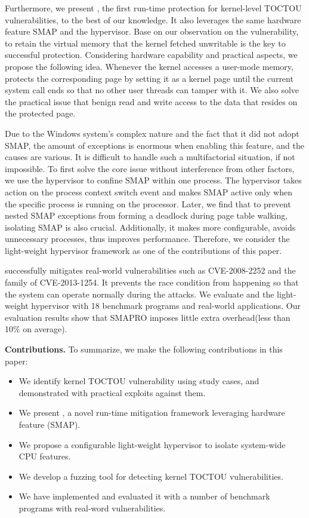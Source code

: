 Furthermore, we present \name, the first run-time protection for kernel-level TOCTOU vulnerabilities, to the best of our knowledge. It also leverages the same hardware feature SMAP and the hypervisor. Base on our observation on the vulnerability, to retain the virtual memory that the kernel fetched unwritable is the key to successful protection. Considering hardware capability and practical aspects, we propose the following idea. Whenever the kernel accesses a user-mode memory, \name protects the corresponding page by setting it as a kernel page until the current system call ends so that no other user threads can tamper with it. We also solve the practical issue that benign read and write access to the data that resides on the protected page.


Due to the Windows system's complex nature and the fact that it did not adopt SMAP, the amount of exceptions is enormous when enabling this feature, and the causes are various. It is difficult to handle such a multifactorial situation, if not impossible. To first solve the core issue without interference from other factors, we use the hypervisor to confine SMAP within one process. The hypervisor takes action on the process context switch event and makes SMAP active only when the specific process is running on the processor. Later, we find that to prevent nested SMAP exceptions from forming a deadlock during page table walking, isolating SMAP is also crucial. Additionally, it makes \name more configurable, avoids unnecessary processes, thus improves performance. Therefore, we consider the light-weight hypervisor framework as one of the contributions of this paper.

\name successfully mitigates real-world vulnerabilities such as CVE-2008-2252 and the family of CVE-2013-1254. It prevents the race condition from happening so that the system can operate normally during the attacks. We evaluate \name and the light-weight hypervisor with 18 benchmark programs and real-world applications. Our evaluation results show that SMAPRO imposes little extra overhead(less than 10\% on average).

\textbf{Contributions.} To summarize, we make the following contributions in this paper:
\begin{itemize}[leftmargin=*]
    \item We identify kernel TOCTOU vulnerability using study cases, and demonstrated with practical exploits against them. 
    \item We present \name, a novel run-time mitigation framework leveraging hardware feature (SMAP). 
    \item We propose a configurable light-weight hypervisor to isolate system-wide CPU features.
    \item We develop a fuzzing tool for detecting kernel TOCTOU vulnerabilities.
    \item We have implemented \name and evaluated it with a number of benchmark programs with real-word vulnerabilities.
  
\end{itemize}


